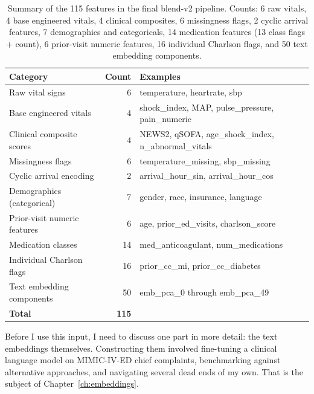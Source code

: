 \begin{table}[htbp]
 \centering
 \caption[Final feature set summary]{Summary of the 115 features in the final blend-v2 pipeline. Counts: 6 raw vitals, 4 base engineered vitals, 4 clinical composites, 6 missingness flags, 2 cyclic arrival features, 7 demographics and categoricals, 14 medication features (13 class flags + count), 6 prior-visit numeric features, 16 individual Charlson flags, and 50 text embedding components.}
 \label{tab:feature-summary}
 \small
 \begin{tabular}{lrl}
 \toprule
 Category & Count & Examples \\
 \midrule
 Raw vital signs & 6 & temperature, heartrate, sbp \\
 Base engineered vitals & 4 & shock\_index, MAP, pulse\_pressure, pain\_numeric \\
 Clinical composite scores & 4 & NEWS2, qSOFA, age\_shock\_index, n\_abnormal\_vitals \\
 Missingness flags & 6 & temperature\_missing, sbp\_missing \\
 Cyclic arrival encoding & 2 & arrival\_hour\_sin, arrival\_hour\_cos \\
 Demographics (categorical) & 7 & gender, race, insurance, language \\
 Prior-visit numeric features & 6 & age, prior\_ed\_visits, charlson\_score \\
 Medication classes & 14 & med\_anticoagulant, num\_medications \\
 Individual Charlson flags & 16 & prior\_cc\_mi, prior\_cc\_diabetes \\
 Text embedding components & 50 & emb\_pca\_0 through emb\_pca\_49 \\
 \midrule
 \textbf{Total} & \textbf{115} & \\
 \bottomrule
 \end{tabular}
\end{table}

Before I use this input, I need to discuss one part in more detail: the text embeddings themselves. Constructing them involved fine-tuning a clinical language model on MIMIC-IV-ED chief complaints, benchmarking against alternative approaches, and navigating several dead ends of my own. That is the subject of Chapter~\ref{ch:embeddings}.

